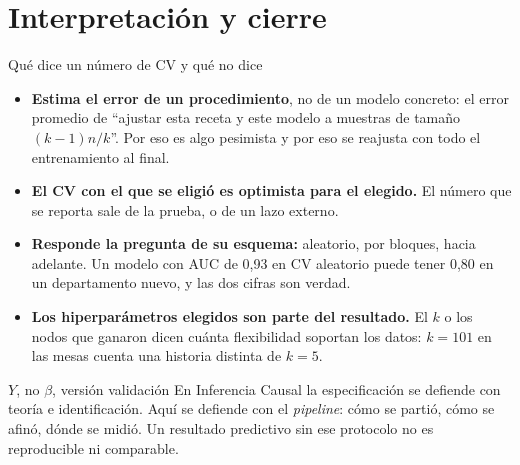 \documentclass{beamer}
\newcommand{\1}{\mathbb{I}}
\begin{document}
\section{Interpretación y cierre}
\begin{frame}[noframenumbering]
\tableofcontents[currentsection]
\end{frame}

\begin{frame}{Qué dice un número de CV y qué no dice}
\small
\begin{itemize}\itemsep5pt
  \item \textbf{Estima el error de un procedimiento}, no de un modelo concreto: el error promedio de ``ajustar esta receta y este modelo a muestras de tamaño $(k-1)n/k$''. Por eso es algo pesimista y por eso se reajusta con todo el entrenamiento al final. \pause
  \item \textbf{El CV con el que se eligió es optimista para el elegido.} El número que se reporta sale de la prueba, o de un lazo externo. \pause
  \item \textbf{Responde la pregunta de su esquema:} aleatorio, por bloques, hacia adelante. Un modelo con AUC de 0,93 en CV aleatorio puede tener 0,80 en un departamento nuevo, y las dos cifras son verdad. \pause
  \item \textbf{Los hiperparámetros elegidos son parte del resultado.} El $k$ o los nodos que ganaron dicen cuánta flexibilidad soportan los datos: $k = 101$ en las mesas cuenta una historia distinta de $k = 5$.
\end{itemize}
\pause
\begin{block}{$Y$, no $\beta$, versión validación}
En Inferencia Causal la especificación se defiende con teoría e identificación. Aquí se defiende con el \emph{pipeline}: cómo se partió, cómo se afinó, dónde se midió. Un resultado predictivo sin ese protocolo no es reproducible ni comparable.
\end{block}
\end{frame}
\end{document}
